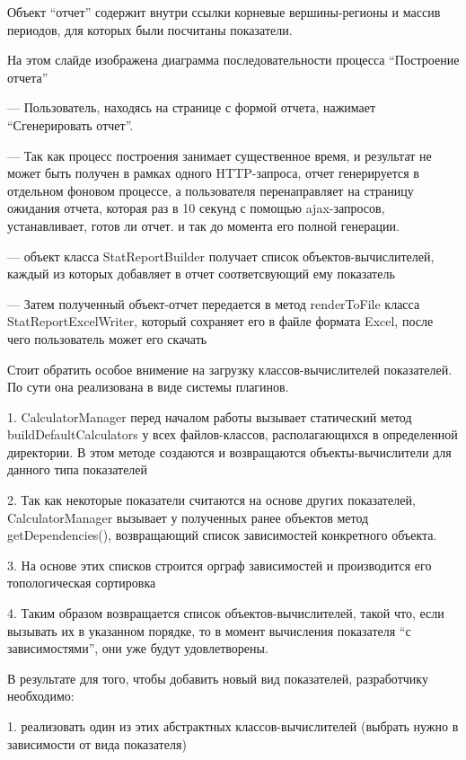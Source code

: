 \documentclass[a4paper]{article}
\begin{document}
Объект “отчет” содержит внутри ссылки корневые вершины-регионы и массив периодов, для которых были посчитаны показатели.

\newpage

На этом слайде изображена диаграмма последовательности процесса “Построение отчета”

--- Пользователь, находясь на странице с формой отчета, нажимает “Сгенерировать отчет”.

--- Так как процесс построения занимает существенное время, и результат не может быть получен в рамках одного HTTP-запроса, 
отчет генерируется в отдельном фоновом процессе, а пользователя перенаправляет на страницу ожидания отчета, которая раз в 10 секунд с помощью ajax-запросов, устанавливает, готов ли отчет.
и так до момента его полной генерации.

--- объект класса StatReportBuilder получает список объектов-вычислителей, каждый из которых добавляет в отчет соответсвующий ему показатель

--- Затем полученный объект-отчет передается в метод renderToFile класса StatReportExcelWriter, который сохраняет его в файле формата Excel, после чего пользователь может его скачать

\newpage
Стоит обратить особое внимение на загрузку классов-вычислителей показателей. По сути она реализована в виде системы плагинов.

1. CalculatorManager перед началом работы вызывает статический метод buildDefaultCalculators у всех файлов-классов, располагающихся в определенной директории.
В этом методе создаются и возвращаются объекты-вычислители для данного типа показателей

2. Так как некоторые показатели считаются на основе других показателей, CalculatorManager вызывает у полученных ранее объектов метод getDependencies(), возвращающий список зависимостей конкретного объекта.

3. На основе этих списков строится орграф зависимостей и производится его топологическая сортировка

4. Таким образом возвращается список объектов-вычислителей, такой что, если вызывать их в указанном порядке, то в момент вычисления показателя “с зависимостями”, они уже будут удовлетворены.

\newpage

В результате для того, чтобы добавить новый вид показателей, разработчику необходимо:

1. реализовать один из этих абстрактных классов-вычислителей (выбрать нужно в зависимости от вида показателя)
\end{document}
